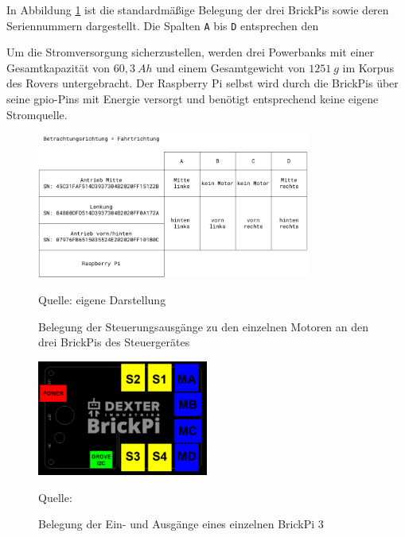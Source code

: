 In Abbildung \ref{fig:brickpistack} ist die standardmäßige Belegung der drei BrickPis sowie deren Seriennummern dargestellt.
Die Spalten \texttt{A} bis \texttt{D} entsprechen den



Um die Stromversorgung sicherzustellen, werden drei Powerbanks mit einer Gesamtkapazität von $60{,}3\ Ah$ und einem Gesamtgewicht von $1251\ g$ im Korpus des Rovers untergebracht.
Der Raspberry Pi selbst wird durch die BrickPis über seine \acs{gpio}-Pins mit Energie versorgt \cite{cole2013} und benötigt entsprechend keine eigene Stromquelle.

\begin{figure}
	\centering
	\includegraphics[width=0.8\textwidth]{../Images/brickpiconfig.pdf}
	\vspace{0.5em}
	\parbox[c]{0.8\linewidth}{\footnotesize
		\centering
		\vspace{1em}
		Quelle: eigene Darstellung
	}
	\caption{Belegung der Steuerungsausgänge zu den einzelnen Motoren an den drei BrickPis des Steuergerätes}
	\label{fig:brickpistack}
\end{figure}

\begin{figure}
	\centering
	\includegraphics[width=0.5\textwidth]{../Images/BrickPi3-Port-Layout.png}
	\vspace{0.5em}
	\parbox[c]{0.8\linewidth}{\footnotesize
		\centering
		\vspace{1em}
		Quelle: \cite{dexter2017}
	}
	\caption{Belegung der Ein- und Ausgänge eines einzelnen BrickPi 3}
	\label{fig:brickpi3ports}
\end{figure}

